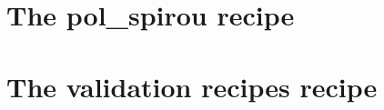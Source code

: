 \clearpage
\newpage
\section{The pol\_spirou recipe}
\label{ch:the_recipes:pol_spirou}


\clearpage
\newpage
\section{The validation recipes recipe}
\label{ch:the_recipes:cal_validate_spirou}
